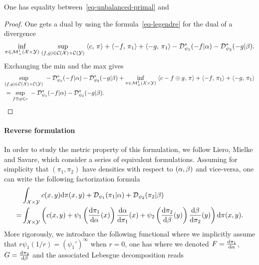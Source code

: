 \begin{prop}One has equality between~\eqref{eq-unbalanced-primal} and
\end{prop}
\begin{proof}
One gets a dual by using the formula~\eqref{eq-legendre} for the dual of a divergence
\begin{align*}
	\underset{\pi \in \mathcal{M}_+^1(\mathcal{X} \times \mathcal{Y})}{\inf}\; \underset{(f,g) \in \mathcal{C}(\mathcal{X}) \times \mathcal{C}(\mathcal{Y})}{\sup}\;
		\langle c,\,\pi\rangle + \langle -f,\,\pi_1\rangle + \langle -g,\,\pi_1\rangle - \mathcal{D}_{\psi_1}^*(-f|\alpha) - \mathcal{D}_{\psi_2}^*(-g|\beta). 
\end{align*}
Exchanging the min and the max gives
\begin{align*}
	&\underset{(f,g) \in \mathcal{C}(\mathcal{X}) \times \mathcal{C}(\mathcal{Y})}{\sup}\;
	- \mathcal{D}_{\psi_1}^*(-f|\alpha) - \mathcal{D}_{\psi_2}^*(-g|\beta)	+ 
		\underset{\pi \in \mathcal{M}_+^1(\mathcal{X} \times \mathcal{Y})}{\inf}\; 
		\langle c-f \oplus g,\,\pi\rangle + \langle -f,\,\pi_1\rangle + \langle -g,\,\pi_1\rangle \\
	&= 	\underset{f \oplus g \leqslant c}{\sup}\;
	- \mathcal{D}_{\psi_1}^*(-f|\alpha) - \mathcal{D}_{\psi_2}^*(-g|\beta).
\end{align*}
\end{proof}


\paragraph{Reverse formulation}

In order to study the metric property of this formulation, we follow Liero, Mielke and Savare, which consider a series of equivalent formulations. 
%
Assuming for simplicity that $(\pi_1,\pi_2)$ have densities with respect to $(\alpha,\beta)$ and vice-versa, one can write the following factorization formula
\begin{align*}
	& \int_{\mathcal{X} \times \mathcal{Y}} c(x,y) \mathrm{d}\pi(x,y)
		+ \mathcal{D}_{\psi_1}(\pi_1|\alpha) + \mathcal{D}_{\psi_2}(\pi_2|\beta) \\
		=&
	\int_{\mathcal{X} \times \mathcal{Y}} \left(  c(x,y)  + 
		\psi_1\left(  \frac{\mathrm{d}\pi_1}{\mathrm{d}\alpha}(x)  \right) \frac{\mathrm{d}\alpha}{\mathrm{d}\pi_1}(x) + 
		\psi_2\left(  \frac{\mathrm{d}\pi_2}{\mathrm{d}\beta}(y)  \right) \frac{\mathrm{d}\beta}{\mathrm{d}\pi_2}(y)
	 \right) \mathrm{d}\pi(x,y).
\end{align*}
More rigorously, we introduce the following functional
where we implicitly assume that $r\psi_1(1/r) = (\psi_1')^\infty$ when $r=0$, 
one has 
where we denoted $F=\frac{\mathrm{d}\pi_1}{\mathrm{d}\alpha}$, $G=\frac{\mathrm{d}\pi_2}{\mathrm{d}\beta}$ and the associated Lebesgue decomposition reads

